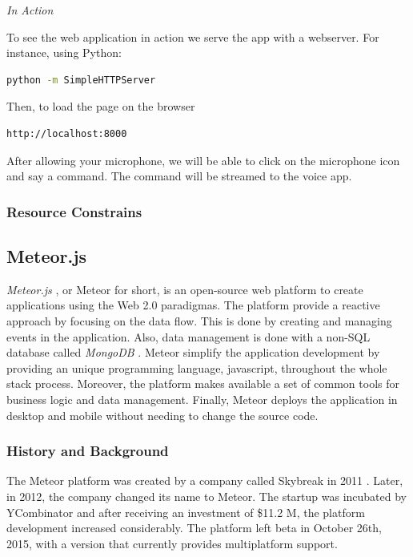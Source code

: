 \emph{In Action}

To see the web application in action we serve the app with a webserver.
For instance, using Python:
\begin{lstlisting}[language=bash]
	python -m SimpleHTTPServer
\end{lstlisting}
Then, to load the page on the browser
\begin{lstlisting}[language=bash]
	http://localhost:8000
\end{lstlisting}



After allowing your microphone, we will be able to click on the microphone icon and say a command. 
The command will be streamed to the voice app.


\subsubsection{Resource Constrains}



\subsection{Meteor.js}

\emph{Meteor.js} \cite{meteor}, or Meteor for short, is an open-source web platform to create applications using the Web 2.0 paradigmas.
The platform provide a reactive approach by focusing on the data flow.
This is done by creating and managing events in the application.
Also, data management is done with a non-SQL database called \emph{MongoDB} \cite{mongo}.
Meteor simplify the application development by providing an unique programming language, javascript, throughout the whole stack process.
Moreover, the platform makes available a set of common tools for business logic and data management.
Finally, Meteor deploys the application in desktop and mobile without needing to change the source code.

\subsubsection{History and Background}

The Meteor platform was created by a company called Skybreak in 2011 \cite{skybreak}.
Later, in 2012, the company changed its name to Meteor.
The startup was incubated by YCombinator \cite{ycomb} and after receiving an investment of \$11.2 M, the platform development increased considerably.
The platform left beta in October 26th, 2015, with a version that currently provides multiplatform support.

